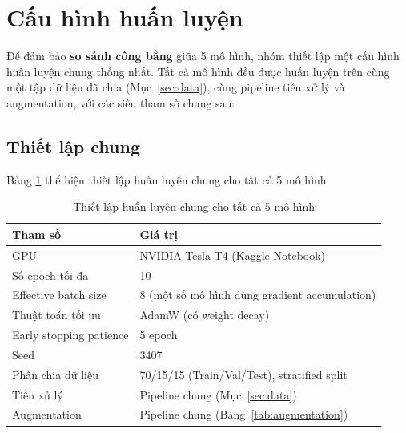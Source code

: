 
\section{Cấu hình huấn luyện}
\label{sec:training_config}

Để đảm bảo \textbf{so sánh công bằng} giữa 5 mô hình, nhóm thiết lập một cấu hình huấn luyện chung thống nhất. Tất cả mô hình đều được huấn luyện trên cùng một tập dữ liệu đã chia (Mục~\ref{sec:data}), cùng pipeline tiền xử lý và augmentation, với các siêu tham số chung sau:

\subsection{Thiết lập chung}
Bảng \ref{tab:common_config} thể hiện thiết lập huấn luyện chung cho tất cả 5 mô hình
\begin{table}[H]
    \caption{Thiết lập huấn luyện chung cho tất cả 5 mô hình}
    \centering
    \begin{tabularx}{0.85\textwidth}{lX}
        \toprule
        \textbf{Tham số}        & \textbf{Giá trị}                              \\
        \midrule
        GPU                     & NVIDIA Tesla T4 (Kaggle Notebook)             \\
        Số epoch tối đa         & 10                                            \\
        Effective batch size    & 8 (một số mô hình dùng gradient accumulation) \\
        Thuật toán tối ưu       & AdamW (có weight decay)                       \\
        Early stopping patience & 5 epoch                                       \\
        Seed                    & 3407                                          \\
        Phân chia dữ liệu       & 70/15/15 (Train/Val/Test), stratified split   \\
        Tiền xử lý              & Pipeline chung (Mục~\ref{sec:data})           \\
        Augmentation            & Pipeline chung (Bảng~\ref{tab:augmentation})  \\
        \bottomrule
    \end{tabularx}
    \label{tab:common_config}
\end{table}

